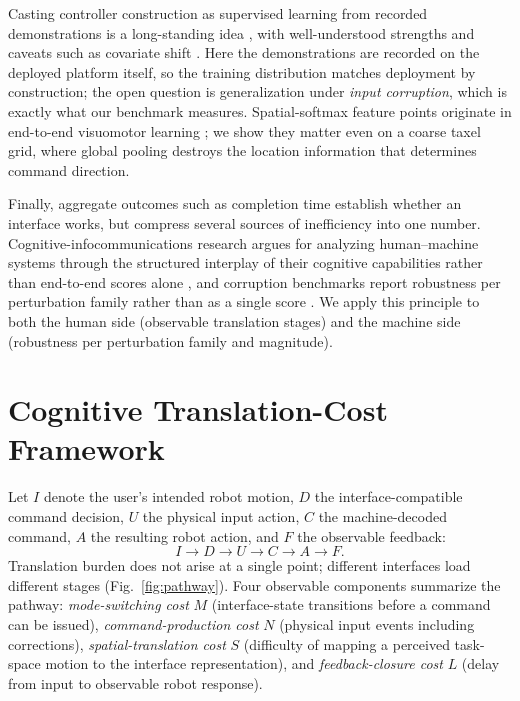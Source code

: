 \documentclass[runningheads]{llncs}
\begin{document}
Casting controller construction as supervised learning from recorded
demonstrations is a long-standing idea \cite{pomerleau1989,argall2009},
with well-understood strengths and caveats such as covariate shift
\cite{ross2011}. Here the demonstrations are recorded on the deployed
platform itself, so the training distribution matches deployment by
construction; the open question is generalization under \emph{input
corruption}, which is exactly what our benchmark measures.
Spatial-softmax feature points originate in end-to-end visuomotor
learning \cite{levine2016,finn2016}; we show they matter even on a
coarse taxel grid, where global pooling destroys the location
information that determines command direction.

Finally, aggregate outcomes such as completion time establish whether an
interface works, but compress several sources of inefficiency into one
number. Cognitive-infocommunications research argues for analyzing
human--machine systems through the structured interplay of their
cognitive capabilities rather than end-to-end scores alone
\cite{baranyi2012}, and corruption benchmarks report robustness per
perturbation family rather than as a single score \cite{hendrycks2019}.
We apply this principle to both the human side (observable translation
stages) and the machine side (robustness per perturbation family and
magnitude).

\section{Cognitive Translation-Cost Framework}
\label{sec:framework}

Let $I$ denote the user's intended robot motion, $D$ the
interface-compatible command decision, $U$ the physical input action, $C$
the machine-decoded command, $A$ the resulting robot action, and $F$ the
observable feedback:
\begin{equation}
I \rightarrow D \rightarrow U \rightarrow C \rightarrow A \rightarrow F.
\label{eq:pathway}
\end{equation}
Translation burden does not arise at a single point; different
interfaces load different stages (Fig.~\ref{fig:pathway}). Four
observable components summarize the pathway: \emph{mode-switching cost}
$M$ (interface-state transitions before a command can be issued),
\emph{command-production cost} $N$ (physical input events including
corrections), \emph{spatial-translation cost} $S$ (difficulty of mapping
a perceived task-space motion to the interface representation), and
\emph{feedback-closure cost} $L$ (delay from input to observable robot
response).
\end{document}
